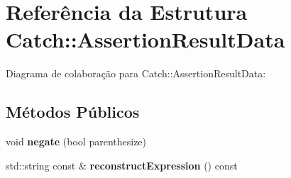 \hypertarget{structCatch_1_1AssertionResultData}{}\section{Referência da Estrutura Catch\+:\+:Assertion\+Result\+Data}
\label{structCatch_1_1AssertionResultData}


Diagrama de colaboração para Catch\+:\+:Assertion\+Result\+Data\+:
\subsection*{Métodos Públicos}
\begin{DoxyCompactItemize}
\item 
void {\bfseries negate} (bool parenthesize)\hypertarget{structCatch_1_1AssertionResultData_a3b4df7cd1f8228ea1144b5cd0af6006a}{}\label{structCatch_1_1AssertionResultData_a3b4df7cd1f8228ea1144b5cd0af6006a}

\item 
std\+::string const \& {\bfseries reconstruct\+Expression} () const \hypertarget{structCatch_1_1AssertionResultData_ac45208e1a464864f4112ac72c6938b4f}{}\label{structCatch_1_1AssertionResultData_ac45208e1a464864f4112ac72c6938b4f}

\end{DoxyCompactItemize}
